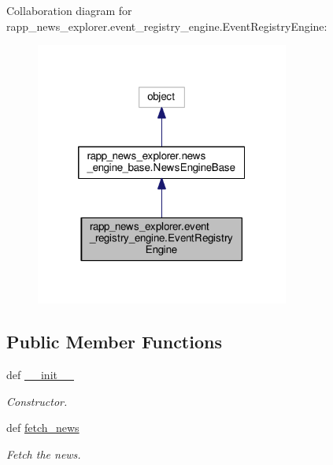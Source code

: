 Collaboration diagram for rapp\-\_\-news\-\_\-explorer.\-event\-\_\-registry\-\_\-engine.\-Event\-Registry\-Engine\-:
\nopagebreak
\begin{figure}[H]
\begin{center}
\leavevmode
\includegraphics[width=236pt]{classrapp__news__explorer_1_1event__registry__engine_1_1EventRegistryEngine__coll__graph}
\end{center}
\end{figure}
\subsection*{Public Member Functions}
\begin{DoxyCompactItemize}
\item 
def \hyperlink{classrapp__news__explorer_1_1event__registry__engine_1_1EventRegistryEngine_ab85d349f51a623b91600d9ccdf2f1c4f}{\-\_\-\-\_\-init\-\_\-\-\_\-}
\begin{DoxyCompactList}\small\item\em Constructor. \end{DoxyCompactList}\item 
def \hyperlink{classrapp__news__explorer_1_1event__registry__engine_1_1EventRegistryEngine_a71d7b5f352b4cd82c2a9d5424f6b7be0}{fetch\-\_\-news}
\begin{DoxyCompactList}\small\item\em Fetch the news. \end{DoxyCompactList}\end{DoxyCompactItemize}
